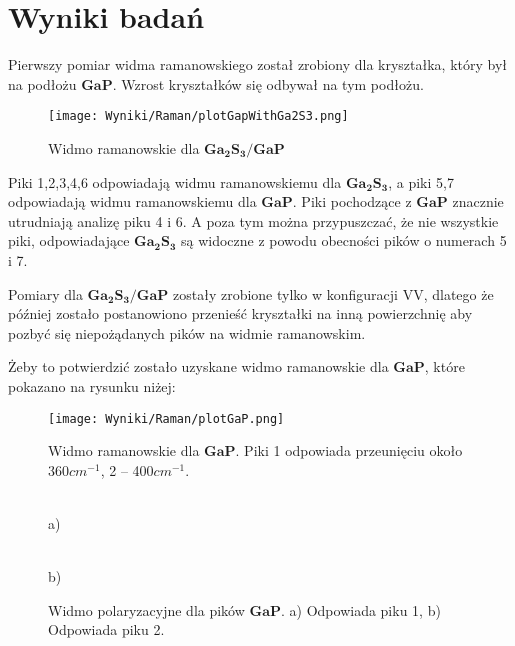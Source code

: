 \newpage

\section{Wyniki badań}

Pierwszy pomiar widma ramanowskiego został zrobiony dla kryształka, który był na podłożu $\mathbf{GaP}$. Wzrost kryształków się odbywał na tym podłożu. 

\begin{figure}[H]
	\begin{center}
		\texttt{[image: Wyniki/Raman/plotGapWithGa2S3.png]}
		\caption{Widmo ramanowskie dla $\mathbf{Ga_{2}S_{3}/GaP}$}
	\end{center}
\end{figure}

Piki 1,2,3,4,6 odpowiadają widmu ramanowskiemu dla $\mathbf{Ga_{2}S_{3}}$, a piki 5,7 odpowiadają widmu ramanowskiemu dla $\mathbf{GaP}$. Piki pochodzące z $\mathbf{GaP}$ znacznie utrudniają analizę piku 4 i 6. A poza tym można przypuszczać, że nie wszystkie piki, odpowiadające $\mathbf{Ga_{2}S_{3}}$ są widoczne z powodu obecności pików o numerach 5 i 7. 

Pomiary dla $\mathbf{Ga_{2}S_{3}/GaP}$ zostały zrobione tylko w konfiguracji VV, dlatego że później zostało postanowiono przenieść kryształki na inną powierzchnię aby pozbyć się niepożądanych pików na widmie ramanowskim. 

\newpage

Żeby to potwierdzić zostało uzyskane widmo ramanowskie dla $\mathbf{GaP}$, które pokazano na rysunku niżej:

\begin{figure}[H]
	\begin{center}
		\texttt{[image: Wyniki/Raman/plotGaP.png]}
		\caption{Widmo ramanowskie dla $\mathbf{GaP}$. Piki 1 odpowiada przeunięciu około 360$cm^{-1}$, 2 -- 400$cm^{-1}$.}
	\end{center}
\end{figure}

\begin{figure}[H]
	\begin{minipage}[h]{0.5\linewidth}
		 \\ a) 
	\end{minipage}
	\hfill
	\begin{minipage}[h]{0.5\linewidth}
		 \\b)
	\end{minipage}
	\caption{Widmo polaryzacyjne dla pików $\mathbf{GaP}$. a) Odpowiada piku 1, b) Odpowiada piku 2.}
\end{figure}

